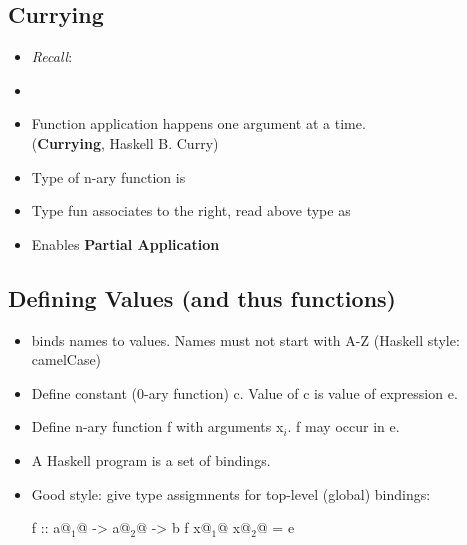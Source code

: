 \subsection{Currying}

\begin{multicols}{2}
\begin{itemize}
  \item \textit{Recall}: 
  \item {}
  \item Function application happens one argument at a time. \\ (\textbf{Currying}, Haskell B. Curry)
  \item Type of n-ary function is \\ 
  \item Type fun \codeline{->} associates to the right, read above type as \\ 
  \item Enables \textbf{Partial Application}
\end{itemize}
\end{multicols}


\subsection{Defining Values (and thus functions)}

\begin{itemize}
  \item \codeline{=} binds names to values. Names must not start with A-Z (Haskell style: camelCase)
  \item Define constant (0-ary function) c. Value of c is value of expression e. \\ 
  \item Define n-ary function f with arguments x$_i$. f may occur in e. \\ 
  \item A Haskell program is a set of bindings.
  \item Good style: give type assigmnents for top-level (global) bindings:\\
  \begin{Haskell}
f :: a@$_1$@ -> a@$_2$@ -> b
f x@$_1$@ x@$_2$@ = e
  \end{Haskell}
\end{itemize}

